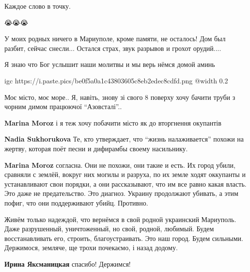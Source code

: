
Каждое слово в точку.


😭😭😭


У моих родных ничего в Мариуполе, кроме памяти, не осталось! Дом был разбит,
сейчас снесли... Остался страх, звук разрывов и грохот орудий....


Я знаю что Бог услышит наши молитвы и мы верь нёмся домой аминь


\ifcmt
  igc https://i.paste.pics/be0f5a0a1c43803605c8eb2edec8cdfd.png
  @width 0.2
\fi


Моє місто, моє море.. Я, навіть, знову зі свого 8 поверху хочу бачити труби з
чорним димом працюючої \enquote{Азовсталі}..

\begin{itemize} %
\textbf{Marina Moroz} і я теж хочу побачити місто як до вторгнення окупантів

\textbf{Nadia Sukhorukova} Те, кто утверждает, что \enquote{жизнь налаживается} похожи на жертву, которая поёт песни и дифирамбы своему насильнику.

\textbf{Marina Moroz} согласна. Они не похожи, они такие и есть. Их город убили, сравняли с землёй, вокруг них могилы и разруха, по их земле ходят оккупанты и устанавливают свои порядки, а они рассказывают, что им все равно какая власть. Это даже не предательство. Это диагноз. Украину продолжают убивать, а этим пофиг, что они поддерживают убийц. Противно.
\end{itemize} %


Живём только надеждой, что вернёмся в свой родной украинский Мариуполь. Даже
разрушенный, уничтоженный, но свой, родной, любимый. Будем восстанавливать его,
строить, благоустраивать. Это наш город. Будем сильными. Держимося, земляче, ще
трохи почекаємо, і назад додому.

\begin{itemize} %
\textbf{Ирина Яксманицкая} спасибо! Держимся!
\end{itemize} %



